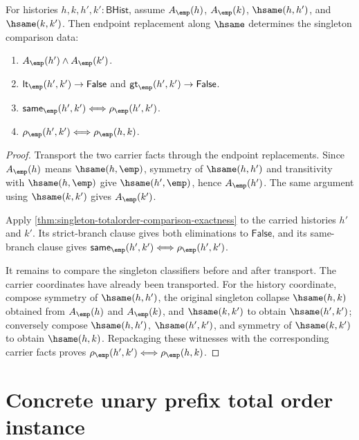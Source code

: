 \begin{theorem}
\label{thm:totalorder-singleton-branch-transport-determinacy}
For histories $h,k,h',k':\mathsf{BHist}$, assume $A_{\emp}(h)$,
$A_{\emp}(k)$, $\hsame(h,h')$, and $\hsame(k,k')$. Then endpoint
replacement along $\hsame$ determines the singleton comparison data:
\begin{enumerate}
  \item $A_{\emp}(h')\land A_{\emp}(k')$.
  \item $\mathsf{lt}_{\emp}(h',k')\to\mathsf{False}$ and
  $\mathsf{gt}_{\emp}(h',k')\to\mathsf{False}$.
  \item $\mathsf{same}_{\emp}(h',k')\Longleftrightarrow
  \rho_{\emp}(h',k')$.
  \item $\rho_{\emp}(h',k')\Longleftrightarrow\rho_{\emp}(h,k)$.
\end{enumerate}
\end{theorem}
\begin{proof}
Transport the two carrier facts through the endpoint replacements. Since
$A_{\emp}(h)$ means $\hsame(h,\emp)$, symmetry of $\hsame(h,h')$ and
transitivity with $\hsame(h,\emp)$ give $\hsame(h',\emp)$, hence
$A_{\emp}(h')$. The same argument using $\hsame(k,k')$ gives
$A_{\emp}(k')$.

Apply \autoref{thm:singleton-totalorder-comparison-exactness} to the carried
histories $h'$ and $k'$. Its strict-branch clause gives both eliminations to
$\mathsf{False}$, and its same-branch clause gives
$\mathsf{same}_{\emp}(h',k')\Longleftrightarrow\rho_{\emp}(h',k')$.

It remains to compare the singleton classifiers before and after transport.
The carrier coordinates have already been transported. For the history
coordinate, compose symmetry of $\hsame(h,h')$, the original singleton
collapse $\hsame(h,k)$ obtained from $A_{\emp}(h)$ and $A_{\emp}(k)$, and
$\hsame(k,k')$ to obtain $\hsame(h',k')$; conversely compose
$\hsame(h,h')$, $\hsame(h',k')$, and symmetry of $\hsame(k,k')$ to obtain
$\hsame(h,k)$. Repackaging these witnesses with the corresponding carrier
facts proves $\rho_{\emp}(h',k')\Longleftrightarrow\rho_{\emp}(h,k)$.
\end{proof}

\section{Concrete unary prefix total order instance}
\label{sec:totalorder-concrete-unary-prefix-instance}

